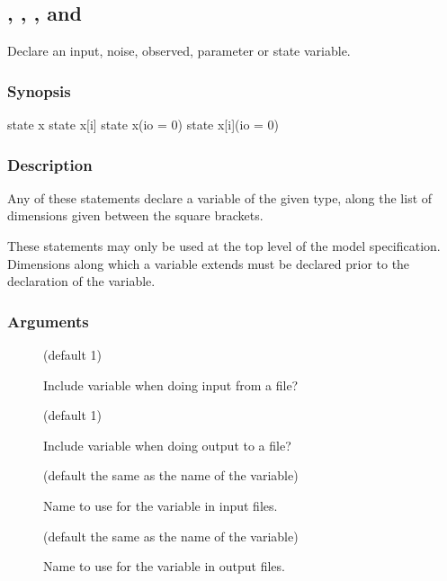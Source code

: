 \subsection{, , ,  and \label{var}}

Declare an input, noise, observed, parameter or state variable.

\subsubsection*{Synopsis\label{var_Synopsis}}

\begin{bicode}
    state x
    state x[i]
    state x(io = 0)
    state x[i](io = 0)
\end{bicode}

\subsubsection*{Description\label{var_Description}}

Any of these statements declare a variable of the given type, along the list
of dimensions given between the square brackets.

These statements may only be used at the top level of the model
specification. Dimensions along which a variable extends must be declared
prior to the declaration of the variable.

\subsubsection*{Arguments\label{var_Arguments}}

\begin{description}
\item[] (default 1)

Include variable when doing input from a file?

\item[] (default 1)

Include variable when doing output to a file?

\item[] (default the same as the name of the
  variable)

Name to use for the variable in input files.

\item[] (default the same as the name of the
  variable)

Name to use for the variable in output files.
\end{description}

